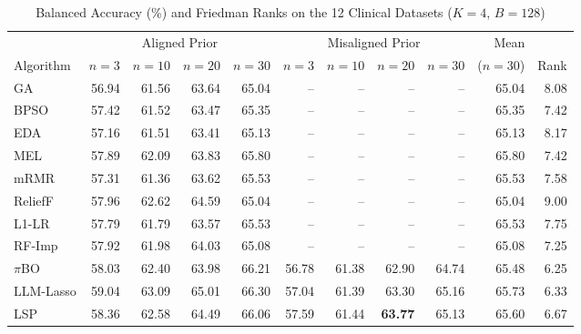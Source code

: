 \begin{table}[!t]
\centering
\begin{threeparttable}
\caption{Balanced Accuracy (\%) and Friedman Ranks on the 12 Clinical Datasets ($K = 4$, $B = 128$)}
\label{tab:clinical_main}
\scriptsize
\setlength{\tabcolsep}{6.0pt}
\renewcommand{\arraystretch}{1.07}
\begin{tabular}{@{}lrrrr@{\hspace{14pt}}rrrr@{\hspace{14pt}}rr@{}}
\toprule
 & \multicolumn{4}{c}{Aligned Prior} & \multicolumn{4}{c}{Misaligned Prior\tnote{a}} & Mean & \\
\cmidrule(lr{14pt}){2-5} \cmidrule(lr{14pt}){6-9}
Algorithm & $n{=}3$ & $n{=}10$ & $n{=}20$ & $n{=}30$ &
$n{=}3$ & $n{=}10$ & $n{=}20$ & $n{=}30$ & ($n{=}30$) & Rank\tnote{b} \\
\midrule
GA                 & 56.94\rlap{\textsuperscript{*}} & 61.56 & 63.64 & 65.04\rlap{\textsuperscript{*}} & -- & -- & -- & -- & 65.04\rlap{\textsuperscript{*}} & 8.08 \\
BPSO               & 57.42 & 61.52 & 63.47 & 65.35 & -- & -- & -- & -- & 65.35 & 7.42 \\
EDA                & 57.16 & 61.51 & 63.41\rlap{\textsuperscript{*}} & 65.13\rlap{\textsuperscript{*}} & -- & -- & -- & -- & 65.13 & 8.17 \\
MEL                & 57.89 & 62.09 & 63.83 & 65.80 & -- & -- & -- & -- & 65.80 & 7.42 \\
mRMR               & 57.31 & 61.36 & 63.62 & 65.53\rlap{\textsuperscript{*}} & -- & -- & -- & -- & 65.53 & 7.58 \\
ReliefF            & 57.96 & 62.62 & 64.59 & 65.04\rlap{\textsuperscript{*}} & -- & -- & -- & -- & 65.04\rlap{\textsuperscript{*}} & 9.00 \\
L1-LR              & 57.79 & 61.79 & 63.57\rlap{\textsuperscript{*}} & 65.53\rlap{\textsuperscript{*}} & -- & -- & -- & -- & 65.53 & 7.75 \\
RF-Imp             & 57.92 & 61.98 & 64.03 & 65.08 & -- & -- & -- & -- & 65.08 & 7.25 \\
\midrule
$\pi$BO            & 58.03 & 62.40 & 63.98\rlap{\textsuperscript{*}} & 66.21 & 56.78 & 61.38 & 62.90 & 64.74 & 65.48 & 6.25 \\
LLM-Lasso          & 59.04 & 63.09 & 65.01 & 66.30 & 57.04 & 61.39 & 63.30 & 65.16 & 65.73 & 6.33 \\
LSP                & 58.36 & 62.58 & 64.49 & 66.06 & 57.59 & 61.44 & \textbf{63.77} & 65.13 & 65.60 & 6.67 \\

\end{tabular}
\end{threeparttable}
\end{table}
